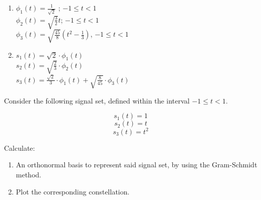 \documentclass[idioma,boletin]{uah}
\begin{document}
{
\begin{enumerate}
	\item $\phi_1(t) = \frac{1}{\sqrt{2}}$ ; $-1 \leq t < 1$\\
	 $\phi_2(t) = \sqrt{\frac{3}{2}}t$; $-1 \leq t < 1$\\
	 $\phi_3(t) = \sqrt{\frac{45}{8}}\left ( t^2 - \frac{1}{3}\right )$, $-1 \leq t < 1$
	\item $s_1(t) = \sqrt{2}\cdot \phi_1(t)$\\
		 $s_2(t)=\sqrt{\frac{2}{3}} \cdot \phi_2(t)$\\
		  $s_3(t) = \frac{\sqrt{2}}{3}\cdot \phi_1(t) + \sqrt{\frac{8}{45}} \cdot \phi_3(t)$
\end{enumerate}
}
{

	Consider the following signal set, defined within the interval $-1 \leq t < 1$.

	\begin{displaymath}
		s_1 (t)=1 
	\end{displaymath}
	\begin{displaymath}
		s_2(t) = t
	\end{displaymath}
	\begin{displaymath}
		s_3(t) = t^2
	\end{displaymath}

Calculate:

\begin{enumerate}
	\item An orthonormal basis to represent said signal set, by using the Gram-Schmidt method.
	\item Plot the corresponding constellation.
\end{enumerate}

}
\end{document}
